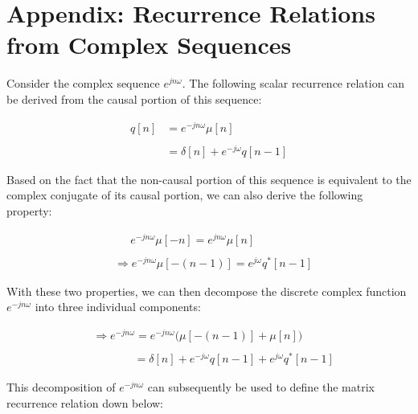 \documentclass{article}
\begin{document}
\section {Appendix: Recurrence Relations from Complex Sequences}

Consider the complex sequence $e^{jn\omega}$. The following scalar recurrence relation can be derived from the causal portion of this sequence:

\begin{align*}
    q[n]&= e^{-jn\omega}\mu[n] \\ \\
        &= \delta[n] + e^{-j\omega}q[n - 1]
  \end{align*}\newline

Based on the fact that the non-causal portion of this sequence is equivalent to the complex conjugate of its causal portion, we can also derive the following property:

\begin{align*}
    &\quad \ \ e^{-jn\omega}\mu[-n] = e^{jn\omega}\mu[n] \\ \\
    &\Rightarrow e^{-jn\omega}\mu[-(n - 1)] = e^{j\omega}q^{*}[n - 1]
  \end{align*}\newline

With these two properties, we can then decompose the discrete complex function $e^{-jn\omega}$ into three individual components: 

\begin{align*}
    &\Rightarrow e^{-jn\omega} = e^{-jn\omega}\bigg(\mu[-(n - 1)] + \mu[n]\bigg) \\ \\
    &\quad \quad \quad \ \ \ = \delta[n] + e^{-j\omega}q[n - 1] + e^{j\omega}q^{*}[n - 1]
  \end{align*}\newline

This decomposition of $e^{-jn\omega}$ can subsequently be used to define the matrix recurrence relation down below:
\end{document}
